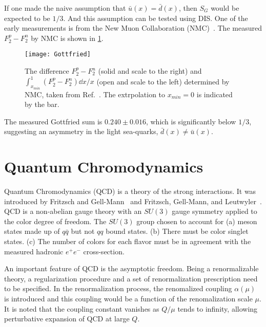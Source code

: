 \documentclass[../main.tex]{subfiles}
\begin{document}
If one made the naive assumption that $\bar{u}\left(x\right)= \bar{d}\left(x\right)$,
then $S_G$ would be expected to be $1/3$. And this assumption can be tested using DIS.
One of the early measurements is from the New Muon Collaboration (NMC)~\cite{amaudruz1991}.
The measured $F_2^p-F_2^n$ by NMC is shown in \cref{fig:NMC_Gottfried}.
\begin{figure}[htbp!]
	\centering
	\texttt{[image: Gottfried]}
	\caption{The difference $F_2^p -F_2^n$ (solid and scale to the right) and
		$\int_{x_{min}}^1 (F_2^p-F_2^n)\dd{x}/x$ (open and scale to the left)
		determined by NMC, taken from Ref.~\cite{amaudruz1991}. The extrpolation
		to $x_{min}=0$ is indicated by the bar.}
	\label{fig:NMC_Gottfried}
\end{figure}
The measured Gottfried sum is $0.240 \pm 0.016$, which is significantly below
$1/3$, suggesting an asymmetry in the light sea-quarks, $\bar{d}(x)\neq \bar{u}(x)$.

\section{Quantum Chromodynamics}
\label{sec:QCD}
Quantum Chromodynamics (QCD) is a theory of the strong interactions. It was
introduced by Fritzsch and Gell-Mann~\cite{fritzsch1972} and Fritzsch, Gell-Mann,
and Leutwyler~\cite{fritzsch1973}. QCD is a non-abelian gauge theory with an
$SU(3)$ gauge symmetry applied to the color degree of freedom. The $SU(3)$ group
chosen to account for (a) meson states made up of $q\bar{q}$ but not $qq$ bound states.
(b) There must be color singlet states. (c) The number of colors for each flavor
must be in agreement with the measured hadronic $e^+ e^-$ cross-section.


An important feature of QCD is the asymptotic freedom. Being a renormalizable
theory, a regularization procedure and a set of renormalization prescription
need to be specified. In the renormalization process, the renomalized coupling $\alpha(\mu)$
is introduced and this coupling would be a function of the renomalization scale $\mu$.
It is noted that the coupling constant vanishes as $Q/\mu$ tends to infinity,
allowing perturbative expansion of QCD at large $Q$.
\end{document}
